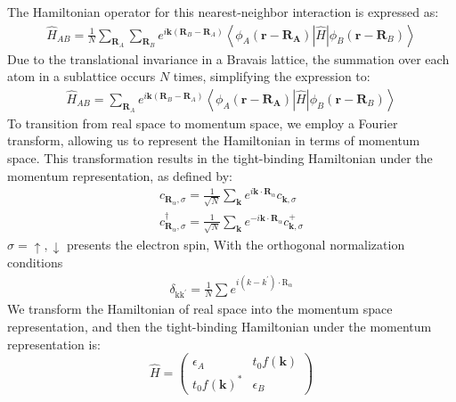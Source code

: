 The Hamiltonian operator for this nearest-neighbor interaction is expressed as:
\begin{align}
\hat{H}_{A B}=\frac{1}{N} \sum_{\mathbf{R}_{A}} \sum_{\mathbf{R}_{B}} e^{i \mathbf{k}\left(\mathbf{R}_{B}-\mathbf{R}_{A}\right)}\left\langle\phi_{A}\left(\mathbf{r}-\mathbf{R}_{\mathbf{A}}\right)|\hat H| \phi_{B}\left(\mathbf{r}-\mathbf{R}_{B}\right)\right\rangle
\end{align}
Due to the translational invariance in a Bravais lattice, the summation over each atom in a sublattice occurs $N$ times, simplifying the expression to:
\begin{align}
\hat{H}_{A B}=\sum_{\mathbf{R}_{A}} e^{i \mathbf{k}\left(\mathbf{R}_{B}-\mathbf{R}_{A}\right)}\left\langle\phi_{A}\left(\mathbf{r}-\mathbf{R}_{\mathbf{A}}\right)|\hat{H}| \phi_{B}\left(\mathbf{r}-\mathbf{R}_{B}\right)\right\rangle
\end{align}
To transition from real space to momentum space, we employ a Fourier transform, allowing us to represent the Hamiltonian in terms of momentum space. This transformation results in the tight-binding Hamiltonian under the momentum representation, as defined by:
\begin{align}
c_{ \mathbf{R}_{\alpha}, \sigma}=\frac{1}{\sqrt{N}} \sum_{\mathbf{k}} e^{i \mathbf{k} \cdot 
 \mathbf{R}_{\alpha}} c_{\mathbf{k}, \sigma} \\
 c_{\mathbf{R}_{\alpha}, \sigma}^{\dagger}=\frac{1}{\sqrt{N}} \sum_{\mathbf{k}} e^{-i \mathbf{k} \cdot \mathbf{R}_{\alpha}} c_{\mathbf{k}, \sigma}^{+}
 \label{eqn: FT}
\end{align}
 $\sigma=\uparrow, \downarrow$ presents the electron spin,
 With the  orthogonal normalization conditions 
 \begin{align}
   \delta_{\mathrm{kk}^{\prime}}=\frac{1}{N} \sum e^{i\left(k-k^{\prime}\right) \cdot \mathrm{R}_{\alpha}}  
 \end{align}
 We transform the Hamiltonian of real space into the momentum space representation, and then the tight-binding Hamiltonian under the momentum representation is:
\begin{equation}
\hat{H} =\left(\begin{array}{cc}
\epsilon_{A} & t_{0} f(\mathbf{k}) \\
t_{0} f(\mathbf{k})^{*} & \epsilon_{B}
\end{array}\right)
\label{eqn: TBh}
\end{equation}

